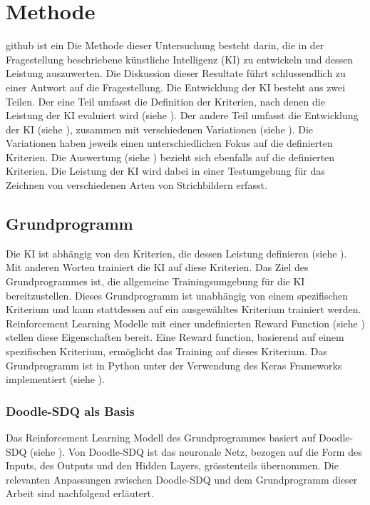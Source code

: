 \chapter{Methode}\label{chap:m}github ist ein
Die Methode dieser Untersuchung besteht darin, die in der Fragestellung
beschriebene künstliche Intelligenz (KI) zu entwickeln und dessen Leistung
auszuwerten. Die Diskussion dieser Resultate führt schlussendlich zu einer
Antwort auf die Fragestellung. Die Entwicklung der KI besteht aus zwei Teilen.
Der eine Teil umfasst die Definition der Kriterien, nach denen die Leistung der
KI evaluiert wird (siehe ). Der andere Teil umfasst die
Entwicklung der KI (siehe ), zusammen mit verschiedenen
Variationen (siehe ). Die Variationen haben jeweils einen
unterschiedlichen Fokus auf die definierten Kriterien. Die Auswertung (siehe
) bezieht sich ebenfalls auf die definierten Kriterien.
Die Leistung der KI wird dabei in einer Testumgebung für das Zeichnen von
verschiedenen Arten von Strichbildern erfasst.

\section{Grundprogramm}\label{chap:m_grund}
Die KI ist abhängig von den Kriterien, die dessen Leistung definieren (siehe
). Mit anderen Worten trainiert die KI auf diese Kriterien.
Das Ziel des Grundprogrammes ist, die allgemeine Trainingsumgebung für die KI
bereitzustellen. Dieses Grundprogramm ist unabhängig von einem spezifischen
Kriterium und kann stattdessen auf ein ausgewähltes Kriterium trainiert werden.
Reinforcement Learning Modelle mit einer undefinierten Reward Function (siehe
) stellen diese Eigenschaften bereit. Eine Reward
function, basierend auf einem spezifischen Kriterium, ermöglicht das Training
auf dieses Kriterium. Das Grundprogramm ist in Python unter der Verwendung des
Keras Frameworks implementiert (siehe ). 

\subsection{Doodle-SDQ als Basis}\label{sub:m_grund_dood}
Das Reinforcement Learning Modell des Grundprogrammes basiert auf Doodle-SDQ
(siehe ). Von Doodle-SDQ ist das neuronale Netz, bezogen
auf die Form des Inputs, des Outputs und den Hidden Layers, grösstenteils
übernommen. Die relevanten Anpassungen zwischen Doodle-SDQ und dem Grundprogramm
dieser Arbeit sind nachfolgend erläutert.


